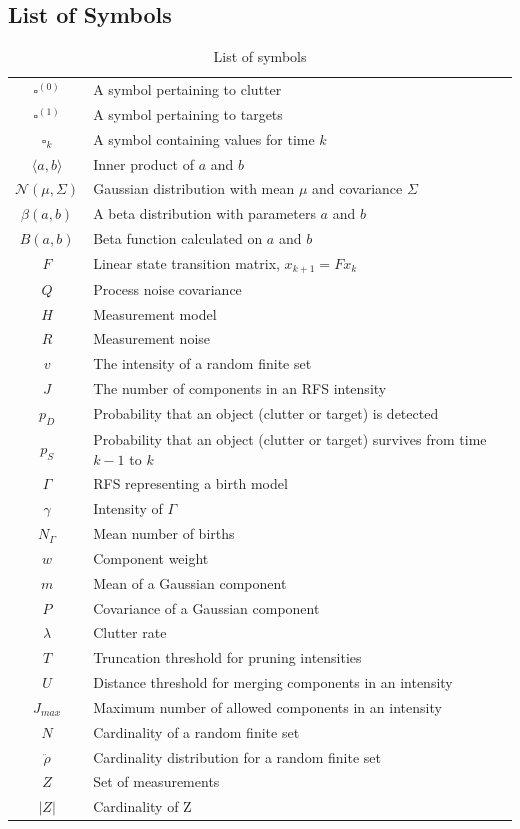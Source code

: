 \documentclass{article}
\newcommand{\clut}{{(0)}}
\newcommand{\tgt}{{(1)}}
\begin{document}
\subsection*{List of Symbols}
\begin{table}[h]
  \begin{center}
    \begin{tabular}{ c l }
      $\square^\clut$ & A symbol pertaining to clutter\\
      $\square^\tgt$ & A symbol pertaining to targets\\
      $\square_k$ & A symbol containing values for time $k$\\
      $\langle a, b \rangle$ & Inner product of $a$ and $b$ \\
      $\mathcal{N}(\mu, \Sigma)$ & Gaussian distribution with mean $\mu$ and covariance $\Sigma$\\
      $\beta(a, b)$ & A beta distribution with parameters $a$ and $b$ \\
      $B(a, b)$ & Beta function calculated on $a$ and $b$ \\
      $F$ & Linear state transition matrix, $x_{k+1} = Fx_k$ \\
      $Q$ & Process noise covariance \\
      $H$ & Measurement model \\
      $R$ & Measurement noise \\
      $v$ & The intensity of a random finite set \\
      $J$ & The number of components in an RFS intensity \\
      $p_{D}$ & Probability that an object (clutter or target) is detected\\
      $p_{S}$ & Probability that an object (clutter or target) survives from time $k-1$ to $k$\\
      $\Gamma$ & RFS representing a birth model\\
      $\gamma$ & Intensity of $\Gamma$ \\
      $N_{\Gamma}$ & Mean number of births \\
      $w$ & Component weight \\
      $m$ & Mean of a Gaussian component \\
      $P$ & Covariance of a Gaussian component \\
      $\lambda$ & Clutter rate \\
      $T$ & Truncation threshold for pruning intensities\\
      $U$ & Distance threshold for merging components in an intensity \\
      $J_{max}$& Maximum number of allowed components in an intensity \\
      $N$ & Cardinality of a random finite set \\
      $\ddot{\rho}$ & Cardinality distribution for a random finite set \\
      $Z$ & Set of measurements \\
      $|Z|$ & Cardinality of Z \\
    \end{tabular}
  \end{center}
  \caption{\label{tab:variables}List of symbols}
\end{table}
\pagebreak
\end{document}
